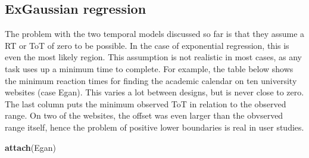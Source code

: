 \documentclass[]{svmono}
\newenvironment{Shaded}{\begin{snugshade}}{\end{snugshade}}
\newcommand{\KeywordTok}[1]{\textcolor[rgb]{0.13,0.29,0.53}{\textbf{#1}}}
\newcommand{\DataTypeTok}[1]{\textcolor[rgb]{0.13,0.29,0.53}{#1}}
\newcommand{\StringTok}[1]{\textcolor[rgb]{0.31,0.60,0.02}{#1}}
\newcommand{\OperatorTok}[1]{\textcolor[rgb]{0.81,0.36,0.00}{\textbf{#1}}}
\newcommand{\NormalTok}[1]{#1}
\begin{document}
\subsection{ExGaussian regression}\label{exgaussian-regression}

The problem with the two temporal models discussed so far is that they
assume a RT or ToT of zero to be possible. In the case of exponential
regression, this is even the most likely region. This assumption is not
realistic in most cases, as any task uses up a minimum time to complete.
For example, the table below shows the minimum reaction times for
finding the academic calendar on ten university websites (case Egan).
This varies a lot between designs, but is never close to zero. The last
column puts the minimum observed ToT in relation to the observed range.
On two of the websites, the offset was even larger than the obvserved
range itself, hence the problem of positive lower boundaries is real in
user studies.

\begin{Shaded}
\begin{Highlighting}[]
\KeywordTok{attach}\NormalTok{(Egan)}
\end{Highlighting}
\end{Shaded}

\begin{Shaded}
\end{Shaded}
\end{document}
